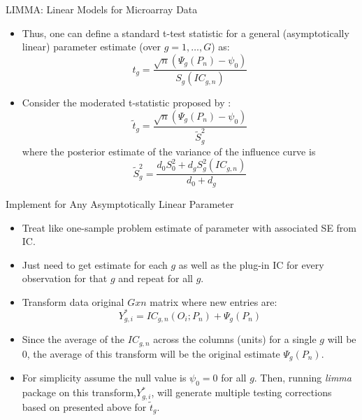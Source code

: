 \documentclass[12pt,t,handout]{beamer}
\begin{document}
\begin{frame}[c]{LIMMA: Linear Models for Microarray Data}

\begin{center}
\begin{itemize}
\item Thus, one can define a standard t-test statistic for a general (asymptotically linear) parameter estimate (over $g=1,\ldots,G$) as:
\[
t_g = \frac{\sqrt{n}(\Psi_g(P_n)-\psi_0)}{S_g(IC_{g,n})}
\]
\item Consider the moderated t-statistic proposed by \cite{Smyth:2005qy}:
\[
\tilde{t}_g = \frac{\sqrt{n}(\Psi_g(P_n)-\psi_0)}{\tilde{S}_g^2}
\]
where the posterior estimate of the variance of the influence curve is  
\[
\tilde{S}^2_g = \frac{d_0 S^2_0 +d_g S^2_g(IC_{g,n})}{d_0+d_g}
\]
\end{itemize}
\end{center}


\end{frame}



\begin{frame}[c]{Implement for Any Asymptotically Linear Parameter}

\begin{center}
\begin{itemize}
\item Treat like one-sample problem estimate of parameter with associated SE from IC.
\item Just need to get estimate for each $g$ as well as the plug-in IC for every observation for that $g$ and repeat for all $g$.
\item Transform data original $G x n$ matrix where new entries are:
\[
Y^*_{g,i} = IC_{g,n}(O_i; P_n)+\Psi_g(P_n)
\]
\item Since the average of the $IC_{g,n}$ across the columns (units) for a single $g$ will be 0, the average of this transform will be the original estimate $\Psi_g(P_n)$.
\item For simplicity assume the null value is $\psi_0 = 0$ for all $g$.  Then, running {\em limma} package on this transform,$Y^*_{g,i}$,  will generate multiple testing corrections based on presented above for $\tilde{t}_g$.
\end{itemize}
\end{center}


\end{frame}
\end{document}

